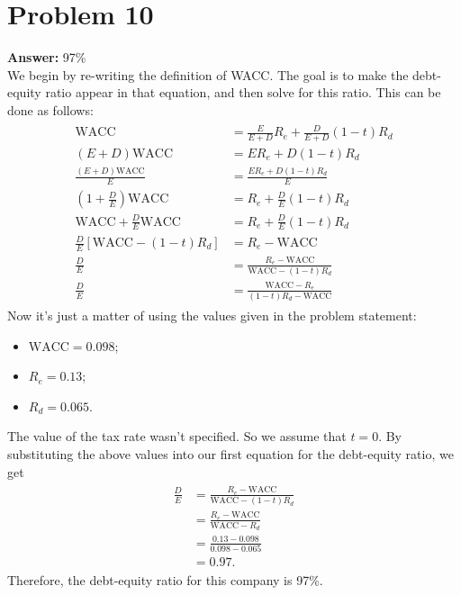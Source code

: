 \documentclass[11pt]{article}
\begin{document}
\section*{Problem 10}
\label{sec:orgbb980ff}

\textbf{Answer:} 97\%\\

We begin by re-writing the definition of WACC. The goal is to make the
debt-equity ratio appear in that equation, and then solve for this ratio. This
can be done as follows:
\begin{align}
  \begin{split}
    \mathrm{WACC}&=\frac{E}{E+D}R_e+\frac{D}{E+D}(1-t)R_d\\
    (E+D)\mathrm{WACC}&=E R_e+D(1-t)R_d\\
    \frac{(E+D)\mathrm{WACC}}{E}&=\frac{E R_e+D(1-t)R_d}{E}\\
    \left(1+\frac{D}{E}\right)\mathrm{WACC}&=R_e+\frac{D}{E}(1-t)R_d\\
    \mathrm{WACC}+\frac{D}{E}\mathrm{WACC}&=R_e+\frac{D}{E}(1-t)R_d\\
    \frac{D}{E}\left[\mathrm{WACC}-(1-t)R_d\right]&=R_e-\mathrm{WACC}\\
    \frac{D}{E}&=\frac{R_e-\mathrm{WACC}}{\mathrm{WACC}-(1-t)R_d}\\
    \frac{D}{E}&=\frac{\mathrm{WACC}-R_e}{(1-t)R_d-\mathrm{WACC}}
  \end{split}
\end{align}
Now it's just a matter of using the values given in the problem statement:
\begin{itemize}
\item \(\mathrm{WACC}=0.098\);
\item \(R_e=0.13\);
\item \(R_d=0.065\).
\end{itemize}
The value of the tax rate wasn't specified. So we assume that \(t=0\). By
substituting the above values into our first equation for the debt-equity ratio,
we get
\begin{align}
  \begin{split}
    \frac{D}{E}&=\frac{R_e-\mathrm{WACC}}{\mathrm{WACC}-(1-t)R_d}\\
    &=\frac{R_e-\mathrm{WACC}}{\mathrm{WACC}-R_d}\\
    &=\frac{0.13-0.098}{0.098-0.065}\\
    &=0.97.
  \end{split}
\end{align}
Therefore, the debt-equity ratio for this company is 97\%.
\end{document}
